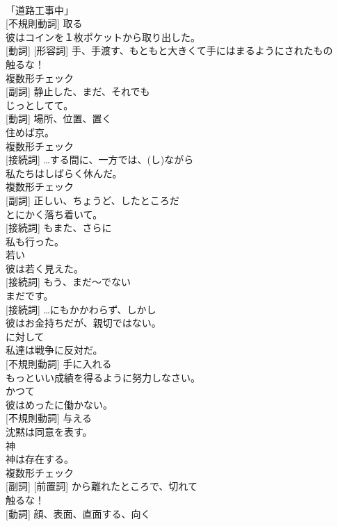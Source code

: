 \documentclass[8pt]{extreport}
\begin{document}
\begin{CJK}{UTF8}{min}
\\	「道路工事中」	
\\	[動詞] [不規則動詞]	取る	
\\	彼はコインを１枚ポケットから取り出した。	
\\	[名詞] [動詞] [形容詞]	手、手渡す、もともと大きくて手にはまるようにされたもの	
\\	触るな！	
\\	複数形チェック
\\	[形容詞] [副詞]	静止した、まだ、それでも	
\\	じっとしてて。	
\\	[名詞] [動詞]	場所、位置、置く	
\\	住めば京。	
\\	複数形チェック
\\	[名詞] [接続詞]	…する間に、一方では、(し)ながら	
\\	私たちはしばらく休んだ。	
\\	複数形チェック
\\	[形容詞] [副詞]	正しい、ちょうど、したところだ	
\\	とにかく落ち着いて。	
\\	[副詞] [接続詞]	もまた、さらに	
\\	私も行った。	
\\	[形容詞]	若い	
\\	彼は若く見えた。	
\\	[副詞] [接続詞]	もう、まだ〜でない	
\\	まだです。	
\\	[副詞] [接続詞]	…にもかかわらず、しかし	
\\	彼はお金持ちだが、親切ではない。	
\\	[前置詞]	に対して	
\\	私達は戦争に反対だ。	
\\	[動詞] [不規則動詞]	手に入れる	
\\	もっといい成績を得るように努力しなさい。	
\\	[副詞]	かつて	
\\	彼はめったに働かない。	
\\	[動詞] [不規則動詞]	与える	
\\	沈黙は同意を表す。	
\\	[名詞]	神	
\\	神は存在する。	
\\	複数形チェック
\\	[形容詞] [副詞] [前置詞]	から離れたところで、切れて	
\\	触るな！	
\\	[名詞] [動詞]	顔、表面、直面する、向く	

\end{CJK}
\end{document}

